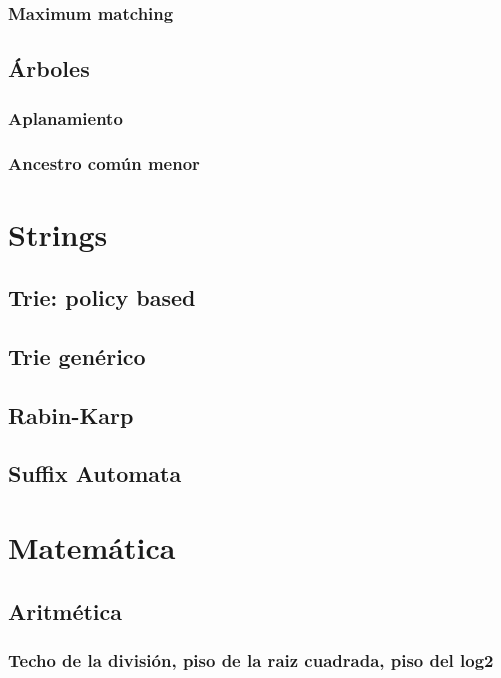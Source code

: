     \subsubsection{Maximum matching}
\subsection{Árboles}
    \subsubsection{Aplanamiento}
    \subsubsection{Ancestro común menor}
        
\section{Strings}
    \subsection{Trie: policy based}
    \subsection{Trie genérico}
    \subsection{Rabin-Karp}
    \subsection{Suffix Automata}

\section{Matemática}
\subsection{Aritmética}
    \subsubsection{Techo de la división, piso de la raiz cuadrada, piso del log2}
